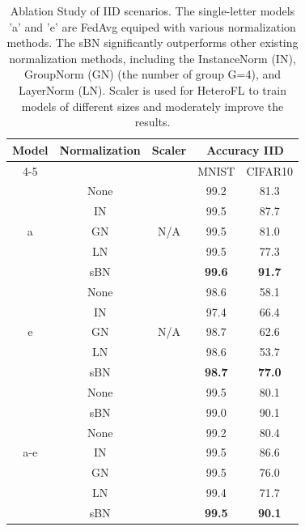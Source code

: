 \documentclass{article} %
\newcommand{\cmark}{\ding{51}}%
\newcommand{\xmark}{\ding{55}}%
\begin{document}
\begin{table}[t]
\centering
\begin{tabular}{@{}ccccc@{}}
\toprule
\multirow{2}{*}{Model} & \multirow{2}{*}{Normalization} & \multirow{2}{*}{Scaler} & \multicolumn{2}{c}{Accuracy IID} \\ \cmidrule(l){4-5} 
                     &      &                      & MNIST         & CIFAR10       \\ \midrule
\multirow{5}{*}{a}   & None & \multirow{5}{*}{N/A} & 99.2          & 81.3          \\
                     & IN   &                      & 99.5          & 87.7          \\
                     & GN   &                      & 99.5          & 81.0          \\
                     & LN   &                      & 99.5          & 77.3          \\
                     & sBN  &                      & \textbf{99.6} & \textbf{91.7} \\ \midrule
\multirow{5}{*}{e}   & None & \multirow{5}{*}{N/A} & 98.6          & 58.1          \\
                     & IN   &                      & 97.4          & 66.4          \\
                     & GN   &                      & 98.7          & 62.6          \\
                     & LN   &                      & 98.6          & 53.7          \\
                     & sBN  &                      & \textbf{98.7} & \textbf{77.0} \\ \midrule
\multirow{7}{*}{a-e} & None & \multirow{2}{*}{\xmark}   & 99.5          & 80.1          \\
                     & sBN  &                      & 99.0          & 90.1          \\ \cmidrule(l){2-5} 
                     & None & \multirow{5}{*}{\cmark}   & 99.2          & 80.4          \\
                     & IN   &                      & 99.5          & 86.6          \\
                     & GN   &                      & 99.5          & 76.0          \\
                     & LN   &                      & 99.4          & 71.7          \\
                     & sBN  &                      & \textbf{99.5} & \textbf{90.1} \\ \bottomrule
\end{tabular}
\vspace{-0.2cm}
\caption{Ablation Study of IID scenarios. The single-letter models 'a' and 'e' are FedAvg equiped with various normalization methods. The sBN significantly outperforms other existing normalization methods, including the InstanceNorm (IN), GroupNorm (GN) (the number of group G=4), and LayerNorm (LN). Scaler is used for HeteroFL to train models of different sizes and moderately improve the results.}
\label{tab:ablation_iid}
\end{table}
\end{document}
